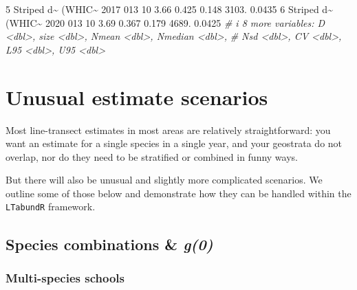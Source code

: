 \documentclass[
]{book}
\newenvironment{Shaded}{\begin{snugshade}}{\end{snugshade}}
\newcommand{\CommentTok}[1]{\textcolor[rgb]{0.56,0.35,0.01}{\textit{#1}}}
\newcommand{\DecValTok}[1]{\textcolor[rgb]{0.00,0.00,0.81}{#1}}
\newcommand{\FloatTok}[1]{\textcolor[rgb]{0.00,0.00,0.81}{#1}}
\newcommand{\NormalTok}[1]{#1}
\newcommand{\SpecialCharTok}[1]{\textcolor[rgb]{0.00,0.00,0.00}{#1}}
\begin{document}
\begin{Shaded}
\begin{Highlighting}[]
\DecValTok{5}\NormalTok{ Striped d}\SpecialCharTok{\textasciitilde{}}\NormalTok{ (WHIC}\SpecialCharTok{\textasciitilde{}} \DecValTok{2017}  \DecValTok{013}             \DecValTok{10}     \FloatTok{3.66}   \FloatTok{0.425} \FloatTok{0.148} \FloatTok{3103.} \FloatTok{0.0435}
\DecValTok{6}\NormalTok{ Striped d}\SpecialCharTok{\textasciitilde{}}\NormalTok{ (WHIC}\SpecialCharTok{\textasciitilde{}} \DecValTok{2020}  \DecValTok{013}             \DecValTok{10}     \FloatTok{3.69}   \FloatTok{0.367} \FloatTok{0.179} \FloatTok{4689.} \FloatTok{0.0425}
\CommentTok{\# i 8 more variables: D \textless{}dbl\textgreater{}, size \textless{}dbl\textgreater{}, Nmean \textless{}dbl\textgreater{}, Nmedian \textless{}dbl\textgreater{},}
\CommentTok{\#   Nsd \textless{}dbl\textgreater{}, CV \textless{}dbl\textgreater{}, L95 \textless{}dbl\textgreater{}, U95 \textless{}dbl\textgreater{}}
\end{Highlighting}
\end{Shaded}

\hypertarget{unusual-estimate-scenarios}{%
\section*{Unusual estimate scenarios}\label{unusual-estimate-scenarios}}

Most line-transect estimates in most areas are relatively straightforward: you want an estimate for a single species in a single year, and your geostrata do not overlap, nor do they need to be stratified or combined in funny ways.

But there will also be unusual and slightly more complicated scenarios. We outline some of those below and demonstrate how they can be handled within the \texttt{LTabundR} framework.

\hypertarget{species-combinations-g0}{%
\subsection*{\texorpdfstring{Species combinations \& \emph{g(0)}}{Species combinations \& g(0)}}\label{species-combinations-g0}}

\hypertarget{multi-species-schools}{%
\subsubsection*{Multi-species schools}\label{multi-species-schools}}
\end{document}
